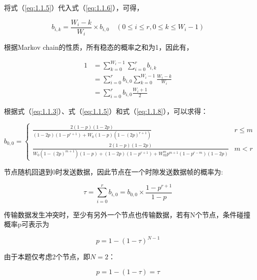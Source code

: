 \documentclass[bwprint]{gmcmthesis}
\begin{document}
将式（\ref{eq:1.1.5}）代入式（\ref{eq:1.1.6}），可得，

\begin{equation}
b_{i,k}=\frac{W_i-k}{W_i}\times b_{i,0} \quad (0\le i\le r,0\le k\le W_i-1
)    \label{eq:1.1.7}
\end{equation}

根据Markov chain的性质，所有稳态的概率之和为1，因此有，

\begin{equation}
    \begin{aligned}
     1 &= {\textstyle \sum_{k=0}^{W_i-1}} {\textstyle \sum_{i=0}^{r}}b_{i,k}\\
    &= {\textstyle \sum_{i=0}^{r}}b_{i,0} {\textstyle \sum_{k=0}^{W_i-1}}\frac{W_i-k}{W_i}\\
    &= {\textstyle \sum_{i=0}^{r}}b_{i,0} \frac{W_i+1}{2} 
    \label{eq:1.1.8}
    \end{aligned}
\end{equation}

根据式（\ref{eq:1.1.3}）、式（\ref{eq:1.1.5}）和式（\ref{eq:1.1.8}），可以求得：

\begin{equation}
b_{0,0}=\left\{\begin{matrix}
\displaystyle \frac{2(1-p)(1-2p)}{(1-2p)(1-p^{r+1})+W_0(1-p)(1-(2p)^{r+1})}  & r\le m\\
\displaystyle \frac{2(1-p)(1-2p)}{W_0(1-(2p)^{m+1})(1-p)+(1-2p)(1-p^{r+1})+W_02^mp^{m+1}(1-p^{r-m})(1-2p)}   & m<r
\end{matrix}\right.
    \label{eq:1.1.9}
\end{equation}

节点随机回退到0时发送数据，因此节点在一个时隙发送数据帧的概率为:

\begin{equation}
\tau = {\displaystyle \sum_{i=0}^{r}} b_{i,0}=b_{0,0}\times \frac{1-p^{r+1}}{1-p} 
    \label{eq:1.1.10}
\end{equation}

传输数据发生冲突时，至少有另外一个节点也传输数据，若有N个节点，条件碰撞概率p可表示为

\begin{equation}
p=1-(1-\tau )^{N-1}
    \label{eq:1.1.11}
\end{equation}

由于本题仅考虑2个节点，即$N=2$：

\begin{equation}
p=1-(1-\tau )=\tau
    \label{eq:1.1.111}
\end{equation}
\end{document}
